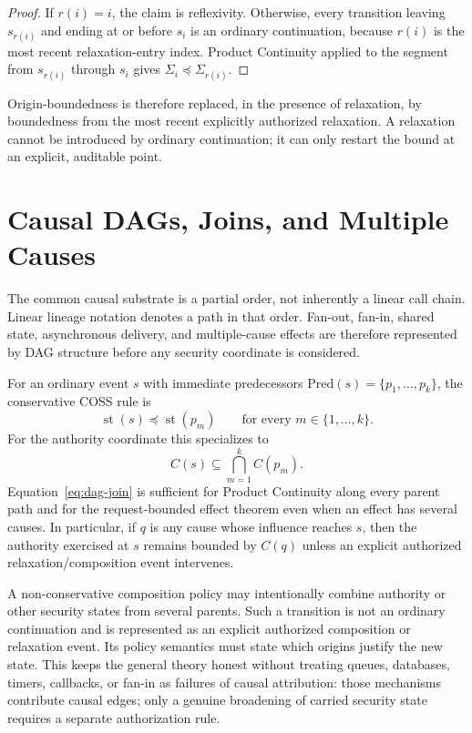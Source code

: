 \documentclass[10pt,twocolumn]{article}
\newcommand{\Model}{\textnormal{\textsc{COSS}}\xspace}
\newcommand{\state}{\Sigma}
\newcommand{\st}{\operatorname{st}}
\begin{document}
\begin{proof}
If $r(i)=i$, the claim is reflexivity. Otherwise, every transition leaving
$s_{r(i)}$ and ending at or before $s_i$ is an ordinary continuation, because
$r(i)$ is the most recent relaxation-entry index. Product Continuity applied
to the segment from $s_{r(i)}$ through $s_i$ gives
$\state_i\preceq\state_{r(i)}$.
\end{proof}

Origin-boundedness is therefore replaced, in the presence of relaxation,
by boundedness from the most recent explicitly authorized relaxation. A
relaxation cannot be introduced by ordinary continuation; it can only
restart the bound at an explicit, auditable point.

\section{Causal DAGs, Joins, and Multiple Causes}

The common causal substrate is a partial order, not inherently a linear call
chain. Linear lineage notation denotes a path in that order. Fan-out, fan-in,
shared state, asynchronous delivery, and multiple-cause effects are therefore
represented by DAG structure before any security coordinate is considered.

For an ordinary event $s$ with immediate predecessors
$\mathrm{Pred}(s)=\{p_1,\ldots,p_k\}$, the conservative \Model rule is
\begin{equation}
  \st(s)\preceq \st(p_m)
  \qquad\text{for every }m\in\{1,\ldots,k\}.
  \label{eq:dag-join}
\end{equation}
For the authority coordinate this specializes to
\begin{equation}
  C(s)\subseteq\bigcap_{m=1}^{k}C(p_m).
\end{equation}
Equation~\eqref{eq:dag-join} is sufficient for Product Continuity along every
parent path and for the request-bounded effect theorem even when an effect has
several causes. In particular, if $q$ is any cause whose influence reaches
$s$, then the authority exercised at $s$ remains bounded by $C(q)$ unless an
explicit authorized relaxation/composition event intervenes.

A non-conservative composition policy may intentionally combine authority or
other security states from several parents. Such a transition is not an
ordinary continuation and is represented as an explicit authorized composition
or relaxation event. Its policy semantics must state which origins justify the
new state. This keeps the general theory honest without treating queues,
databases, timers, callbacks, or fan-in as failures of causal attribution: those
mechanisms contribute causal edges; only a genuine broadening of carried
security state requires a separate authorization rule.
\end{document}
